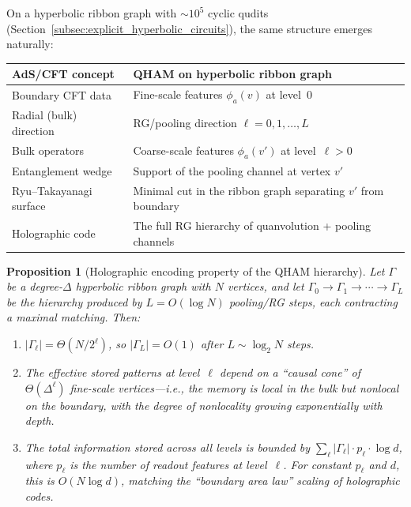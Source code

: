 \documentclass[11pt,oneside]{amsbook}
\numberwithin{equation}{section}
\theoremstyle{plain}
\newtheorem{proposition}[theorem]{Proposition}
\theoremstyle{definition}
\theoremstyle{remark}
\begin{document}
On a hyperbolic ribbon graph with $\sim 10^5$ cyclic qudits
(Section~\ref{subsec:explicit_hyperbolic_circuits}), the same structure emerges naturally:

\begin{center}
\renewcommand{\arraystretch}{1.2}
\begin{tabular}{l@{\qquad$\longleftrightarrow$\qquad}l}
\toprule
\textbf{AdS/CFT concept} & \textbf{QHAM on hyperbolic ribbon graph} \\
\midrule
Boundary CFT data & Fine-scale features $\phi_a(v)$ at level~$0$ \\
Radial (bulk) direction & RG/pooling direction $\ell=0,1,\ldots,L$ \\
Bulk operators & Coarse-scale features $\phi_a(v')$ at level~$\ell>0$ \\
Entanglement wedge & Support of the pooling channel at vertex $v'$ \\
Ryu--Takayanagi surface & Minimal cut in the ribbon graph separating $v'$ from boundary\\
Holographic code & The full RG hierarchy of quanvolution + pooling channels\\
\bottomrule
\end{tabular}
\end{center}

\begin{proposition}[Holographic encoding property of the QHAM hierarchy]
\label{prop:holographic_encoding}
Let $\Gamma$ be a degree-$\Delta$ hyperbolic ribbon graph with $N$ vertices, and let
$\Gamma_0\to\Gamma_1\to\cdots\to\Gamma_L$ be the hierarchy produced by $L=O(\log N)$
pooling/RG steps, each contracting a maximal matching.
Then:
\begin{enumerate}
\item $|\Gamma_\ell|=\Theta(N/2^\ell)$, so $|\Gamma_L|=O(1)$ after $L\sim\log_2 N$ steps.
\item The effective stored patterns at level~$\ell$ depend on a ``causal cone'' of
$\Theta(\Delta^\ell)$ fine-scale vertices---i.e., the memory is local in the bulk but
nonlocal on the boundary, with the degree of nonlocality growing exponentially with depth.
\item The total information stored across all levels is bounded by
$\sum_\ell |\Gamma_\ell|\cdot p_\ell\cdot\log d$, where $p_\ell$ is the number of readout
features at level~$\ell$.  For constant $p_\ell$ and $d$, this is $O(N\log d)$, matching the
``boundary area law'' scaling of holographic codes.
\end{enumerate}
\end{proposition}
\end{document}

